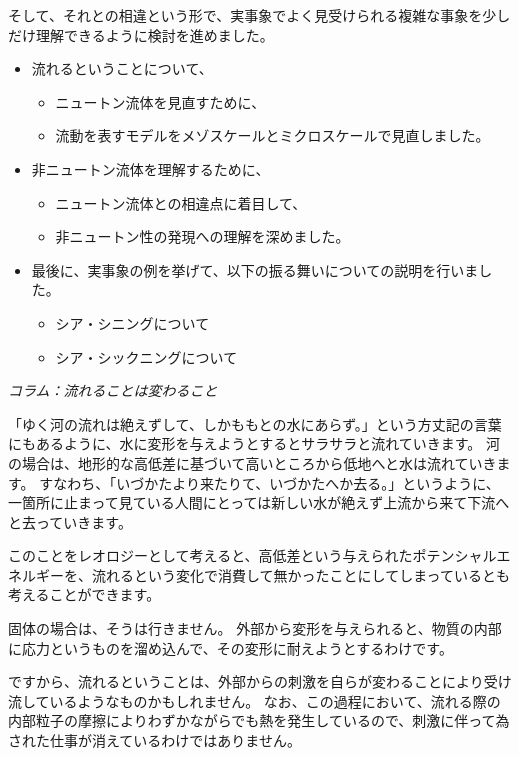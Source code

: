 \documentclass[uplatex,dvipdfmx,a4paper,11pt]{jsarticle}
\begin{document}
そして、それとの相違という形で、実事象でよく見受けられる複雑な事象を少しだけ理解できるように検討を進めました。
\begin{boxnote}
    \begin{itemize}
		\item 流れるということについて、
		\begin{itemize}
			\item ニュートン流体を見直すために、
			\item 流動を表すモデルをメゾスケールとミクロスケールで見直しました。
		\end{itemize} 
		\item 非ニュートン流体を理解するために、
		\begin{itemize}
			\item ニュートン流体との相違点に着目して、
			\item 非ニュートン性の発現への理解を深めました。
		\end{itemize} 
		\item 最後に、実事象の例を挙げて、以下の振る舞いについての説明を行いました。
		\begin{itemize}
			\item シア・シニングについて
			\item シア・シックニングについて
		\end{itemize}
	\end{itemize}
\end{boxnote}

\newpage

\begin{longartdeco}
	\begin{center}
	\emph{コラム：流れることは変わること}	
	\end{center}

	「ゆく河の流れは絶えずして、しかももとの水にあらず。」という方丈記の言葉にもあるように、水に変形を与えようとするとサラサラと流れていきます。
河の場合は、地形的な高低差に基づいて高いところから低地へと水は流れていきます。
すなわち、「いづかたより来たりて、いづかたへか去る。」というように、一箇所に止まって見ている人間にとっては新しい水が絶えず上流から来て下流へと去っていきます。

このことをレオロジーとして考えると、高低差という与えられたポテンシャルエネルギーを、流れるという変化で消費して無かったことにしてしまっているとも考えることができます。

固体の場合は、そうは行きません。
外部から変形を与えられると、物質の内部に応力というものを溜め込んで、その変形に耐えようとするわけです。

ですから、流れるということは、外部からの刺激を自らが変わることにより受け流しているようなものかもしれません。
なお、この過程において、流れる際の内部粒子の摩擦によりわずかながらでも熱を発生しているので、刺激に伴って為された仕事が消えているわけではありません。
	
\end{longartdeco}
\end{document}
